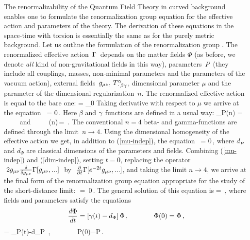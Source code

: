 The renormalizability of the Quantum Field Theory in curved
background enables one to formulate the renormalization group 
equation for the effective action and parameters of the theory. 
The derivation of these equations in the 
space-time with torsion is essentially the same as for the 
purely metric background. Let us outline the  
formulation of the renormalization group \cite{tmf,book}.
The renormalized effective action 
$\,\Gamma\,$ depends on the matter fields $\Phi$ (as before, 
we denote {\it all} kind of non-gravitational fields in 
this way), 
parameters $\,P\,$ (they include all couplings, masses, non-minimal 
parameters and the parameters of the vacuum action), external fields 
$\,g_{\mu\nu},\, T^\alpha_{\,\cdot\,\beta\gamma}$, dimensional parameter 
$\mu$ and the parameter of the dimensional regularization $\,n$. 
The renormalized effective action is equal to the bare one: 
\beq
\Ga{}
= \Ga_0
\label{bare-ren}
\eeq
Taking derivative with respect to $\mu$ we arrive at the equation
\beq
{}\,
\Ga{}
= 0\,.
\label{mu-indep}
\eeq
Here $\beta$ and $\gamma$ functions are defined in a usual way:
\beq
\beta_P(n) = \mu{} \,\,\,\,\,\,\,\,\,\,\,\,
{\rm and} \,\,\,\,\,\,\,\,\,\,\,\,
\ga(n)\,\Phi = \mu\frac{\pa \Phi}{\pa\mu}\,.
\label{bety}
\eeq
The conventional $n=4$ beta- and gamma-functions are defined 
through the limit $\,n \to 4$.
Using the dimensional homogeneity of the effective action
we get, in addition to (\ref{mu-indep}), the equation 
\beq
{}\,
\Ga{} = 0\,,
\label{dim-indep}
\eeq
where $d_P$ and $d_\Phi$ are classical dimensions of the parameters
and fields. Combining (\ref{mu-indep}) and (\ref{dim-indep}), 
setting $t=0$, replacing the operator 
$\,\,2g_{\mu\nu}\frac{\delta}{\delta g_{\mu\nu}}\Gamma[g_{\mu\nu},...]\,\,$
by $\,\,\frac{\partial}{\partial t}\Gamma[e^{-2t}g_{\mu\nu},...]$, and taking 
the limit $n\to 4$, 
we arrive at the final form of the renormalization group 
equation appropriate for the study of the short-distance 
limit: 
\beq
{}\,\Ga{} \,=\, 0\,.
\label{RGE}
\eeq
The general solution of this equation is 
\beq
\Ga{}
= \Ga{}\,,
\label{sol-RGE}
\eeq
where fields and parameters satisfy the equations
$$
\frac{d\Phi}{dt} = [\gamma(t)-d_\Phi]\,\Phi
\,,\,\,\,\,\,\,\,\,\,\,\,\,\,\,\,\,\,\,\,\,\,\,
\Phi(0)=\Phi\,,
$$
\beq
{} = \be_P(t)-d_P
\,,\,\,\,\,\,\,\,\,\,\,\,\,\,\,\,\,\,\,\,\,\,\, P(0)=P\,.
\label{RGE-const}
\eeq

